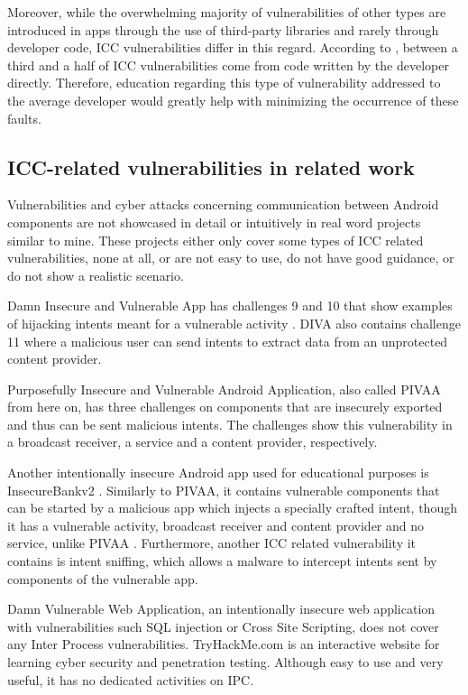 		Moreover, while the overwhelming majority of vulnerabilities of other types are introduced in apps through the use of third-party libraries and rarely through developer code, ICC vulnerabilities differ in this regard. According to \cite{android_vulnerabilities_evolution}, between a third and a half of ICC vulnerabilities come from code written by the developer directly. Therefore, education regarding this type of vulnerability addressed to the average developer would greatly help with minimizing the occurrence of these faults.
		
		\subsection{ICC-related vulnerabilities in related work}
		    \label{sec:ICC_related_work}
		
		Vulnerabilities and cyber attacks concerning communication between Android components are not showcased in detail or intuitively in real word projects similar to mine. These projects either only cover some types of ICC related vulnerabilities, none at all, or are not easy to use, do not have good guidance, or do not show a realistic scenario.
		
		Damn Insecure and Vulnerable App has challenges 9 and 10 that show examples of hijacking intents meant for a vulnerable activity \cite{diva_walkthrough}. DIVA also contains challenge 11 where a malicious user can send intents to extract data from an unprotected content provider. 
		
		Purposefully Insecure and Vulnerable Android Application, also called PIVAA from here on, has three challenges on components that are insecurely exported and thus can be sent malicious intents. The challenges show this vulnerability in a broadcast receiver, a service and a content provider, respectively.
		
		Another intentionally insecure Android app used for educational purposes is InsecureBankv2 \cite{android_insecure_bank_github}. Similarly to PIVAA, it contains vulnerable components that can be started by a malicious app which injects a specially crafted intent, though it has a vulnerable activity, broadcast receiver and content provider and no service, unlike PIVAA \cite{android_insecure_bank_walkthrough}. Furthermore, another ICC related vulnerability it contains is intent sniffing, which allows a malware to intercept intents sent by components of the vulnerable app.
		
		Damn Vulnerable Web Application, an intentionally insecure web application with vulnerabilities such SQL injection or Cross Site Scripting, does not cover any Inter Process vulnerabilities. TryHackMe.com is an interactive website for learning cyber security and penetration testing. Although easy to use and very useful, it has no dedicated activities on IPC.
		
